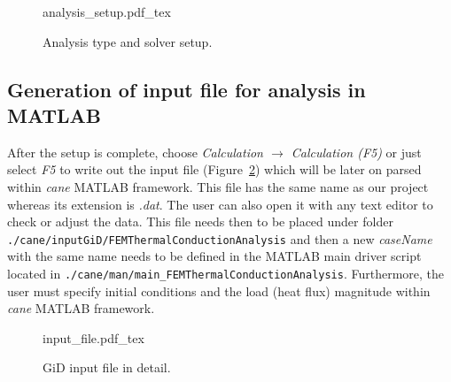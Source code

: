 \documentclass[10pt,a4paper]{article}
\begin{document}
\begin{figure}[ht]
	\centering
	\footnotesize
    \def\svgwidth{0.7\textwidth}{analysis_setup.pdf_tex}
	\caption{Analysis type and solver setup.}
	\label{im:analysis_setup}
\end{figure}



\subsection{Generation of input file for analysis in MATLAB}

After the setup is complete, choose \textit{Calculation $\rightarrow$ Calculation (F5)} or just select \textit{F5} to write out the input file (Figure~\ref{im:input_file}) which will be later on parsed within \textit{cane} MATLAB framework. This file has the same name as our project whereas its extension is \textit{.dat}. The user can also open it with any text editor to check or adjust the data. This file needs then to be placed under folder \verb+./cane/inputGiD/FEMThermalConductionAnalysis+ and then a new \textit{caseName} with the same name needs to be defined in the MATLAB main driver script located in \verb+./cane/man/main_FEMThermalConductionAnalysis+. Furthermore, the user must specify initial conditions and the load (heat flux) magnitude within \textit{cane} MATLAB framework.

\begin{figure}[ht]
	\centering
	\footnotesize
    \def\svgwidth{0.8\textwidth}{input_file.pdf_tex}
	\caption{GiD input file in detail.}
	\label{im:input_file}
\end{figure}




% 


\nocite{*}
\end{document}

